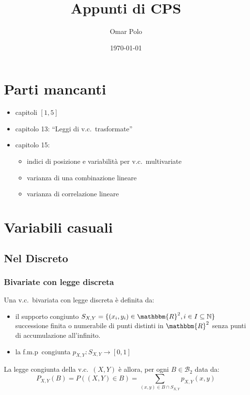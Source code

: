 \documentclass[11pt,a4paper,twoside]{article}
\author{Omar Polo}
\date{\today}
\title{Appunti di CPS}
\newcommand\N{\mathbb{N}}
\newcommand\R{\mathbbm{R}}
\newcommand\B{\mathcal{B}}
\begin{document}
\maketitle
\tableofcontents
\thispagestyle{empty}
\newpage
\setcounter{page}{1}

\section{Parti mancanti}
\begin{itemize}
\item capitoli \([1, 5]\)
\item capitolo 13: ``Leggi di v.c.\ trasformate''
\item capitolo 15:
  \begin{itemize}
  \item indici di posizione e variabilità per v.c.\ multivariate
  \item varianza di una combinazione lineare
  \item varianza di correlazione lineare
  \end{itemize}
\end{itemize}

\section{Variabili casuali}

\subsection{Nel Discreto}

\subsubsection{Bivariate con legge discreta}

Una v.c.\ bivariata con legge discreta è definita da:
\begin{itemize}
\item il supporto congiunto \(S_{X,Y} = \{ (x_i,y_i) \in \R^2, i\in I
  \subseteq \N \}\) successione finita o numerabile di punti distinti
  in \(\R^2\) senza punti di accumulazione all'infinito.
\item la f.m.p\ congiunta \(p_{X,Y} : S_{X,Y}\rightarrow [0,1]\)
\end{itemize}

La legge congiunta della v.c.\ \((X,Y)\) è allora, per ogni
\(B\in\B_2\) data da:
\begin{equation}\label{eq:legge-congiunta-bivariate}
  P_{X,Y}(B) = P((X,Y) \in B) = \sum_{(x,y)\in B\cap S_{X,Y}} p_{X,Y}(x,y)
\end{equation}
\end{document}
